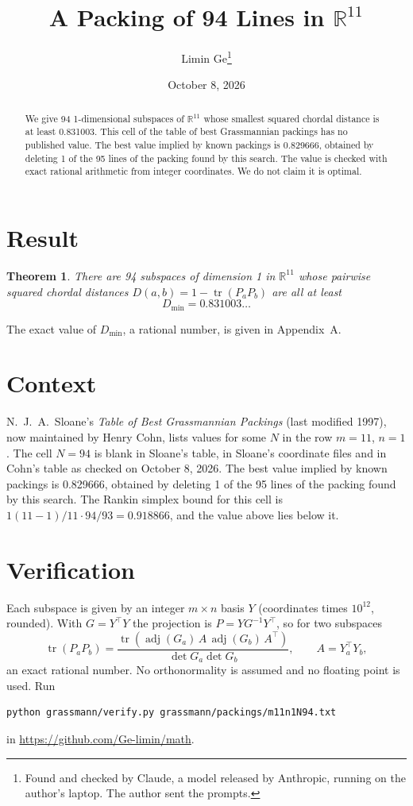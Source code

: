 \documentclass[11pt,a4paper]{article}
\title{A Packing of 94 Lines in $\mathbb{R}^{11}$}
\author{Limin Ge\thanks{Found and checked by Claude, a model released by Anthropic, running on the author's laptop. The author sent the prompts.}}
\date{October 8, 2026}
\newtheorem*{theorem}{Theorem}
\begin{document}
\maketitle
\begin{abstract}
We give 94 1-dimensional subspaces of $\mathbb{R}^{11}$ whose smallest squared chordal distance is at least 0.831003. This cell of the table of best Grassmannian packings has no published value. The best value implied by known packings is 0.829666, obtained by deleting 1 of the 95 lines of the packing found by this search. The value is checked with exact rational arithmetic from integer coordinates. We do not claim it is optimal.
\end{abstract}

\section{Result}
\begin{theorem}
There are 94 subspaces of dimension 1 in $\mathbb{R}^{11}$ whose pairwise squared chordal distances $D(a,b) = 1 - \operatorname{tr}(P_aP_b)$ are all at least
\[ D_{\min} = 0.831003\ldots \]
\end{theorem}
The exact value of $D_{\min}$, a rational number, is given in Appendix~A.


\section{Context}
N.~J.~A.~Sloane's \emph{Table of Best Grassmannian Packings} (last modified 1997), now maintained by Henry Cohn, lists values for some $N$ in the row $m=11$, $n=1$. The cell $N=94$ is blank in Sloane's table, in Sloane's coordinate files and in Cohn's table as checked on October 8, 2026. The best value implied by known packings is 0.829666, obtained by deleting 1 of the 95 lines of the packing found by this search. The Rankin simplex bound for this cell is $1(11-1)/11\cdot 94/93 = 0.918866$, and the value above lies below it.


\section{Verification}
Each subspace is given by an integer $m\times n$ basis $Y$ (coordinates times $10^{12}$, rounded). With $G=Y^\top Y$ the projection is $P=YG^{-1}Y^\top$, so for two subspaces
\[ \operatorname{tr}(P_aP_b)=\frac{\operatorname{tr}(\operatorname{adj}(G_a)\,A\,\operatorname{adj}(G_b)\,A^\top)}{\det G_a\det G_b},\qquad A=Y_a^\top Y_b, \]
an exact rational number. No orthonormality is assumed and no floating point is used. Run
\begin{verbatim}
python grassmann/verify.py grassmann/packings/m11n1N94.txt
\end{verbatim}
in \url{https://github.com/Ge-limin/math}.
\end{document}
